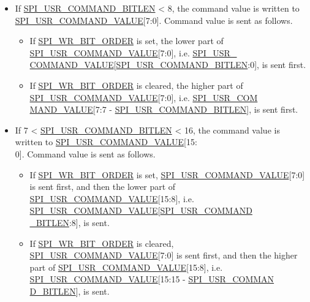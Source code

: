 \documentclass[main\_\_EN.tex]{subfiles}
\begin{document}
\begin{itemize}

\item If \hyperref[fielddesc:SPIUSRCOMMANDBITLEN]{SPI\_USR\_COMMAND\_BITLEN} < 8, the command value is written to \hyperref[fielddesc:SPIUSRCOMMANDVALUE]{SPI\_USR\_COMMAND\_VALUE}[7:0]. Command value is sent as follows.
\begin{itemize}
    \item If \hyperref[fielddesc:SPIWRBITORDER]{SPI\_WR\_BIT\_ORDER} is set, the lower part of \hyperref[fielddesc:SPIUSRCOMMANDVALUE]{SPI\_USR\_COMMAND\_VALUE}[7:0], i.e. \hyperref[fielddesc:SPIUSRCOMMANDVALUE]{SPI\_USR\_\\COMMAND\_VALUE}[\hyperref[fielddesc:SPIUSRCOMMANDBITLEN]{SPI\_USR\_COMMAND\_BITLEN}:0], is sent first.
    \item If \hyperref[fielddesc:SPIWRBITORDER]{SPI\_WR\_BIT\_ORDER} is cleared, the higher part of \hyperref[fielddesc:SPIUSRCOMMANDVALUE]{SPI\_USR\_COMMAND\_VALUE}[7:0], i.e. \hyperref[fielddesc:SPIUSRCOMMANDVALUE]{SPI\_USR\_COM\\MAND\_VALUE}[7:7 - \hyperref[fielddesc:SPIUSRCOMMANDBITLEN]{SPI\_USR\_COMMAND\_BITLEN}], is sent first.
\end{itemize}

\item If 7 < \hyperref[fielddesc:SPIUSRCOMMANDBITLEN]{SPI\_USR\_COMMAND\_BITLEN} < 16, the command value is written to \hyperref[fielddesc:SPIUSRCOMMANDVALUE]{SPI\_USR\_COMMAND\_VALUE}[15:\\0]. Command value is sent as follows.
\begin{itemize}
    \item If \hyperref[fielddesc:SPIWRBITORDER]{SPI\_WR\_BIT\_ORDER} is set, \hyperref[fielddesc:SPIUSRCOMMANDVALUE]{SPI\_USR\_COMMAND\_VALUE}[7:0] is sent first, and then the lower part of  \hyperref[fielddesc:SPIUSRCOMMANDVALUE]{SPI\_USR\_COMMAND\_VALUE}[15:8], i.e. \hyperref[fielddesc:SPIUSRCOMMANDVALUE]{SPI\_USR\_COMMAND\_VALUE}[\hyperref[fielddesc:SPIUSRCOMMANDBITLEN]{SPI\_USR\_COMMAND\\\_BITLEN}:8], is sent.
    \item If \hyperref[fielddesc:SPIWRBITORDER]{SPI\_WR\_BIT\_ORDER} is cleared, \hyperref[fielddesc:SPIUSRCOMMANDVALUE]{SPI\_USR\_COMMAND\_VALUE}[7:0] is sent first, and then the higher part of \hyperref[fielddesc:SPIUSRCOMMANDVALUE]{SPI\_USR\_COMMAND\_VALUE}[15:8], i.e. \hyperref[fielddesc:SPIUSRCOMMANDVALUE]{SPI\_USR\_COMMAND\_VALUE}[15:15 - \hyperref[fielddesc:SPIUSRCOMMANDBITLEN]{SPI\_USR\_COMMAN\\D\_BITLEN}], is sent.
\end{itemize}
\end{itemize}
\end{document}
